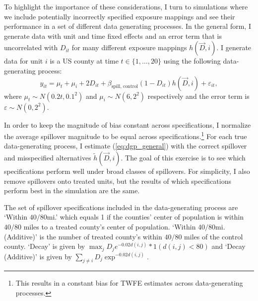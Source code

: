 \documentclass[11pt]{article}
\begin{document}
To highlight the importance of these considerations, I turn to simulations where we include potentially incorrectly specified exposure mappings and see their performance in a set of different data generating processes. In the general form, I generate data with unit and time fixed effects and an error term that is uncorrelated with $D_{it}$ for many different exposure mappings $h(\vec{D}, i)$. I generate data for unit $i$ is a US county at time $t \in \{1, \dots, 20\}$ using the following data-generating process:
\begin{equation}\label{eq:dgp_general}
    y_{it} = \mu_t + \mu_i + 2 D_{it} + \beta_{\text{spill, control}} (1-D_{it}) h(\vec{D}, i) + \varepsilon_{it},
\end{equation}
where $\mu_t \sim N(0.2t, 0.1^2)$ and $\mu_i \sim N(6, 2^2)$ respectively and the error term is $\varepsilon \sim N(0, 2^2)$. 

In order to keep the magnitude of bias constant across specifications, I normalize the average spillover magnitude to be equal across specifications.\footnote{This results in a constant bias for TWFE estimates across data-generating processes.} For each true data-generating process, I estimate (\ref{eq:dgp_general}) with the correct spillover and misspecified alternatives $\tilde{h}(\vec{D}, i)$. The goal of this exercise is to see which specifications perform well under broad classes of spillovers. For simplicity, I also remove spillovers onto treated units, but the results of which specifications perform best in the simulation are the same. 

The set of spillover specifications included in the data-generating process are `Within $40/80$mi.' which equals 1 if the counties' center of population is within $40/80$ miles to a treated county's center of population. `Within $40/80$mi. (Additive)' is the number of treated county's within $40/80$ miles of the control county. `Decay' is given by $\max_j D_j e^{-0.02 d(i,j)} * 1(d(i,j) < 80)$ and `Decay (Additive)' is given by $\sum_{j \neq i} D_j \exp^{-0.02 d(i,j)}$.
\end{document}

